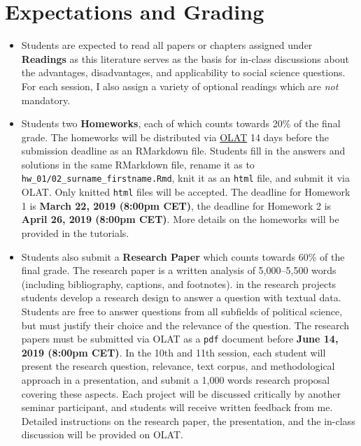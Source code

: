 \documentclass[abstract=on,parskip=full,headings=standardclasses,fontsize=11pt,paper=a4]{scrartcl}
\begin{document}
\section*{Expectations and Grading}


\begin{itemize}
\item Students are expected to read all papers or chapters assigned under \textbf{Readings} as this literature serves as the basis for in-class discussions about the advantages, disadvantages, and applicability to social science questions. For each session, I also assign a variety of optional readings which are \textit{not} mandatory.
\item Students two \textbf{Homeworks}, each of which counts towards  20\% of the final grade. The homeworks will be distributed via \href{https://www.id.uzh.ch/de/dl/elearning/services/olatunizh.html}{OLAT} 14 days before the submission deadline as an RMarkdown file. Students fill in the answers and solutions in the same RMarkdown file, rename it as to \texttt{hw\_01/02\_surname\_firstname.Rmd}, knit it as an \texttt{html} file, and submit it via OLAT. Only knitted \texttt{html} files will be accepted. The deadline for Homework 1 is \textbf{March 22, 2019 (8:00pm CET)}, the deadline for Homework 2 is \textbf{April 26, 2019 (8:00pm CET)}. More details on the homeworks will be provided in the tutorials. 
\item Students also submit a \textbf{Research Paper} which counts towards 60\% of the final grade. The research paper is a written analysis of 5,000--5,500 words (including bibliography, captions, and footnotes). in the research projects students develop a research design to answer a question with textual data. Students are free to answer questions from all subfields of political science, but must justify their choice and the relevance of the question. The research papers must be submitted via OLAT as a \texttt{pdf} document before \textbf{June 14, 2019 (8:00pm CET)}. In the 10th and 11th session, each student will present the research question, relevance, text corpus, and methodological approach in a presentation, and submit a 1,000 words research proposal covering these aspects. Each project will be discussed critically by another seminar participant, and students will receive written feedback from me. Detailed instructions on the research paper, the presentation, and the in-class discussion will be provided on OLAT.
\end{itemize}
\end{document}
